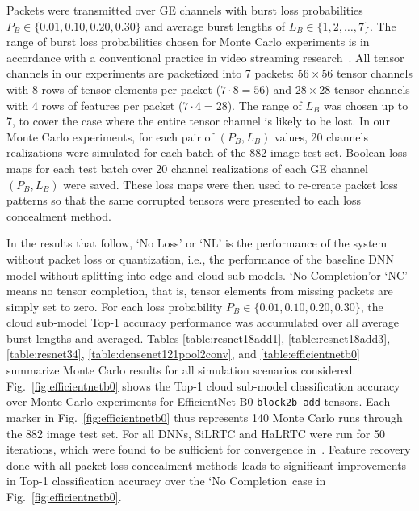\documentclass[conference,letterpaper]{IEEEtran}
\begin{document}
Packets were transmitted over GE channels with burst loss probabilities $P_B \in \{0.01, 0.10, 0.20, 0.30\}$ and average burst lengths of $L_B \in \{1, 2, \dotsc, 7\}$. %
The range of burst loss probabilities chosen for Monte Carlo experiments is in accordance with a conventional practice in video streaming research~\cite{video2002}. 
All tensor channels in our experiments are packetized into 7 packets: $56 \times 56$ tensor channels with 8 rows of tensor elements per packet ($7\cdot8=56$) and $28 \times 28$ tensor channels with 4 rows of features per packet ($7\cdot4=28$). 
The range of $L_B$ was chosen up to 7, to cover the case where the entire tensor channel is likely to be lost. In our Monte Carlo experiments, for each pair of $(P_B,L_B)$ values, 20 channels realizations were simulated for each batch of the 882 image test set. Boolean loss maps for each test batch over 20 channel realizations of each GE channel $(P_B,L_B)$ were saved. These loss maps were then used to re-create packet loss patterns so that the same corrupted tensors were presented to each loss concealment method.

In the results that follow, `No Loss' or `NL' is the performance of the system without packet loss or quantization, i.e., the performance of the baseline DNN model without splitting into edge and cloud sub-models. `No Completion'or `NC' means no tensor completion, that is, tensor elements from missing packets are simply set to zero. For each loss probability $P_B \in \{0.01,0.10,0.20,0.30\}$, the cloud sub-model Top-1 accuracy performance was accumulated over all average burst lengths and averaged. Tables \ref{table:resnet18add1}, \ref{table:resnet18add3}, \ref{table:resnet34}, \ref{table:densenet121pool2conv}, and \ref{table:efficientnetb0} summarize Monte Carlo results for all simulation scenarios considered. Fig.~\ref{fig:efficientnetb0} shows the Top-1 cloud sub-model classification accuracy over Monte Carlo experiments for EfficientNet\nobreakdash-B0 \texttt{block2b\_add} tensors. Each marker in Fig.~\ref{fig:efficientnetb0} thus represents 140 Monte Carlo runs through the 882 image test set. For all DNNs, SiLRTC and HaLRTC were run for 50 iterations, which were found to be sufficient for convergence in~\cite{Bragile2020}. Feature recovery done with all packet loss concealment methods leads to significant improvements in Top-1 classification accuracy over the `No Completion\ case in Fig.~\ref{fig:efficientnetb0}.
\end{document}
